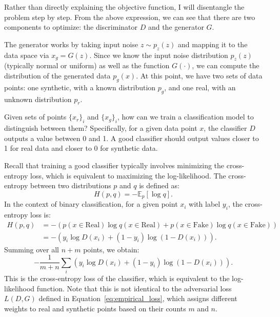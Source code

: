 \documentclass[12pt]{article}
\begin{document}
Rather than directly explaining the objective function, I will disentangle the
problem step by step. From the above expression, we can see that there are two
components to optimize: the discriminator \(D\) and the generator \(G\).

The generator works by taking input noise \(z \sim p_z(z)\) and mapping it to
the data space via \(x_g = G(z)\). Since we know the input noise distribution
\(p_z(z)\) (typically normal or uniform) as well as the function \(G(\cdot)\),
we can compute the distribution of the generated data \(p_g(x)\). At this
point, we have two sets of data points: one synthetic, with a known
distribution \(p_g\), and one real, with an unknown distribution \(p_r\).

Given sets of points \(\{x_r\}_i\) and \(\{x_g\}_i\), how can we train a
classification model to distinguish between them? Specifically, for a given
data point \(x\), the classifier \(D\) outputs a value between 0 and 1. A good
classifier should output values closer to 1 for real data and closer to 0 for
synthetic data.

Recall that training a good classifier typically involves minimizing the
cross-entropy loss, which is equivalent to maximizing the log-likelihood. The
cross-entropy between two distributions \(p\) and \(q\) is defined as:
\begin{equation*}
    H(p, q) = -\mathbb{E}_p[\log q].
\end{equation*}
In the context of binary classification, for a given point \(x_i\) with label \(y_i\), the cross-entropy loss is:
\begin{equation*}
    \begin{split}
        H(p, q) & = - \left( p(x \in \text{Real}) \log q(x \in \text{Real}) + p(x \in \text{Fake}) \log q(x \in \text{Fake}) \right) \\
                & = -\left(y_i \log D(x_i) + (1-y_i) \log (1-D(x_i))\right).
    \end{split}
\end{equation*}
Summing over all \(n + m\) points, we obtain:
\begin{equation*}
    -\frac{1}{m+n}\sum_i \left( y_i \log D(x_i) + (1-y_i) \log (1-D(x_i)) \right).
\end{equation*}
This is the cross-entropy loss of the classifier, which is equivalent to the log-likelihood function. Note that this is not identical to the adversarial loss \(L(D, G)\) defined in Equation~\eqref{eq:empirical_loss}, which assigns different weights to real and synthetic points based on their counts \(m\) and \(n\).
\end{document}
